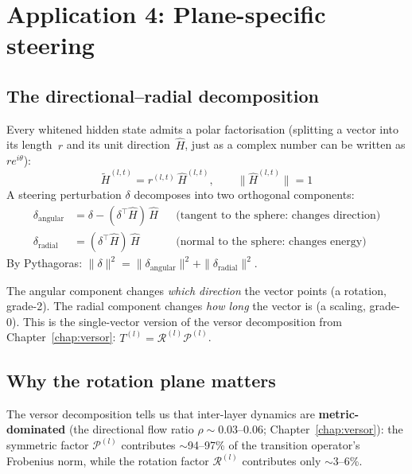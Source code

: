 \documentclass[11pt, twoside, openright]{memoir}
\newcommand{\rotor}[1]{\mathcal{R}^{(#1)}}  %
\newcommand{\metric}[1]{\mathcal{P}^{(#1)}} %
\numberwithin{equation}{chapter}
\begin{document}
\section{Application 4: Plane-specific steering}
\label{sec:steering}

\subsection{The directional--radial decomposition}

Every whitened hidden state admits a polar factorisation (splitting a vector into its length~$r$ and its unit direction~$\hat{H}$, just as a complex number can be written as $r e^{i\theta}$):
\begin{equation}
  \widetilde{H}^{(l,t)} = r^{(l,t)} \, \hat{H}^{(l,t)},
  \qquad \|\hat{H}^{(l,t)}\| = 1
\end{equation}
A steering perturbation $\delta$ decomposes into two orthogonal
components:
\begin{align}
  \delta_{\text{angular}} &= \delta - (\delta^\top \hat{H})\,\hat{H}
  &&\text{(tangent to the sphere: changes direction)} \\
  \delta_{\text{radial}} &= (\delta^\top \hat{H})\,\hat{H}
  &&\text{(normal to the sphere: changes energy)}
\end{align}
By Pythagoras:
$\|\delta\|^2 = \|\delta_{\text{angular}}\|^2 +
\|\delta_{\text{radial}}\|^2$.

\begin{transformer}
The angular component changes \emph{which direction} the vector points (a rotation, grade-2). The radial component changes \emph{how long} the vector is (a scaling, grade-0). This is the single-vector version of the versor decomposition from Chapter~\ref{chap:versor}: $T^{(l)} = \rotor{l}\metric{l}$.
\end{transformer}

\subsection{Why the rotation plane matters}

The versor decomposition tells us that inter-layer dynamics are
\textbf{metric-dominated} (the directional flow ratio
$\rho \sim 0.03$--$0.06$; Chapter~\ref{chap:versor}): the
symmetric factor $\metric{l}$
contributes $\sim$94--97\% of the transition operator's Frobenius norm,
while the rotation factor $\rotor{l}$ contributes only $\sim$3--6\%.
\end{document}
